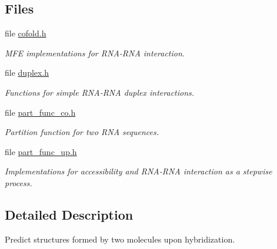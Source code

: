 \subsection*{Files}
\begin{DoxyCompactItemize}
\item 
file \hyperlink{cofold_8h}{cofold.\+h}
\begin{DoxyCompactList}\small\item\em M\+FE implementations for R\+N\+A-\/\+R\+NA interaction. \end{DoxyCompactList}\item 
file \hyperlink{duplex_8h}{duplex.\+h}
\begin{DoxyCompactList}\small\item\em Functions for simple R\+N\+A-\/\+R\+NA duplex interactions. \end{DoxyCompactList}\item 
file \hyperlink{part__func__co_8h}{part\+\_\+func\+\_\+co.\+h}
\begin{DoxyCompactList}\small\item\em Partition function for two R\+NA sequences. \end{DoxyCompactList}\item 
file \hyperlink{part__func__up_8h}{part\+\_\+func\+\_\+up.\+h}
\begin{DoxyCompactList}\small\item\em Implementations for accessibility and R\+N\+A-\/\+R\+NA interaction as a stepwise process. \end{DoxyCompactList}\end{DoxyCompactItemize}


\subsection{Detailed Description}
Predict structures formed by two molecules upon hybridization. 

